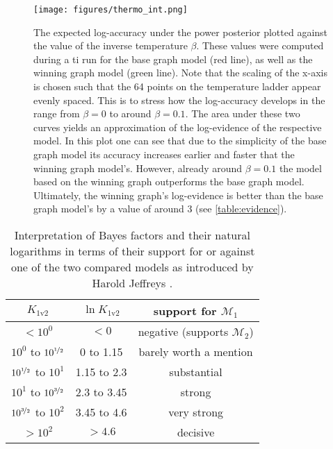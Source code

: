 \documentclass[twocolumn]{aastex631}
\begin{document}
\begin{figure}
    \centering
    \texttt{[image: figures/thermo\_int.png]}
    \caption{The expected log-accuracy under the power posterior plotted against the value of the inverse temperature $\beta$. These values were computed during a \gls{ti} run for the base graph model (red line), as well as the winning graph model (green line). Note that the scaling of the x-axis is chosen such that the 64 points on the temperature ladder appear evenly spaced. This is to stress how the log-accuracy develops in the range from $\beta=0$ to around $\beta=0.1$. The area under these two curves yields an approximation of the log-evidence of the respective model. In this plot one can see that due to the simplicity of the base graph model its accuracy increases earlier and faster that the winning graph model's. However, already around $\beta=0.1$ the model based on the winning graph outperforms the base graph model. Ultimately, the winning graph's log-evidence is better than the base graph model's by a value of around 3 (see \cref{table:evidence}).}
    \label{fig:thermo_int}
\end{figure}

\begin{table}
    \centering
    \begin{tabular}{ | c | c | c | }
        \hline
        $K_\text{1v2}$ & $\ln{K_\text{1v2}}$ & support for $\mathcal{M}_1$ \\
        \hline
        $< 10^0$ & $< 0$ & negative (supports $\mathcal{M}_2$) \\
        $10^0$ to $10^{\nicefrac{1}{2}}$ & 0 to 1.15 & barely worth a mention \\
        $10^{\nicefrac{1}{2}}$ to $10^1$ & 1.15 to 2.3 & substantial \\
        $10^1$ to $10^{\nicefrac{3}{2}}$ & 2.3 to 3.45 & strong \\
        $10^{\nicefrac{3}{2}}$ to $10^2$ & 3.45 to 4.6 & very strong \\
        $> 10^2$ & $> 4.6$ & decisive \\
        \hline
    \end{tabular}
    \caption{Interpretation of Bayes factors and their natural logarithms in terms of their support for or against one of the two compared models as introduced by Harold Jeffreys \cite{jeffreys_theory_1998}.}
    \label{table:bayes_factor}
\end{table}
\end{document}
